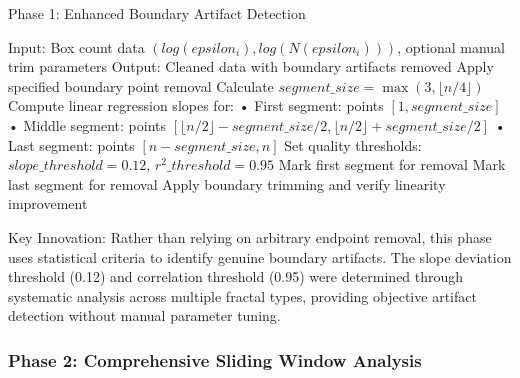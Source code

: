 \documentclass[preprint,12pt]{elsarticle}
\def\textbf#1{#1}%
\def\epsilon{epsilon}%
\begin{document}
\begin{algorithm}[!htbp]
\caption{Phase 1: Enhanced Boundary Artifact Detection}
\label{alg:phase1}
\begin{algorithmic}[1]
\State \textbf{Input:} Box count data $(log(\epsilon_i), log(N(\epsilon_i)))$, optional manual trim parameters
\State \textbf{Output:} Cleaned data with boundary artifacts removed
\State
{}
    \State Apply specified boundary point removal
\EndIf
\State
{}
    \State Calculate $segment\_size = \max(3, \lfloor n/4 \rfloor)$
    \State Compute linear regression slopes for:
    \State \hspace{1em} • First segment: points $[1, segment\_size]$
    \State \hspace{1em} • Middle segment: points $[\lfloor n/2 \rfloor - segment\_size/2, \lfloor n/2 \rfloor + segment\_size/2]$
    \State \hspace{1em} • Last segment: points $[n - segment\_size, n]$
    \State
    \State Set quality thresholds: $slope\_threshold = 0.12$, $r^2\_threshold = 0.95$
    \State
        \State Mark first segment for removal
    \EndIf
        \State Mark last segment for removal
    \EndIf
    \State
    \State Apply boundary trimming and verify linearity improvement
\EndIf
\end{algorithmic}
\end{algorithm}

\textbf{Key Innovation}: Rather than relying on arbitrary endpoint removal, this phase uses statistical criteria to identify genuine boundary artifacts. The slope deviation threshold (0.12) and correlation threshold (0.95) were determined through systematic analysis across multiple fractal types, providing objective artifact detection without manual parameter tuning.

\subsubsection{Phase 2: Comprehensive Sliding Window Analysis}
\end{document}
